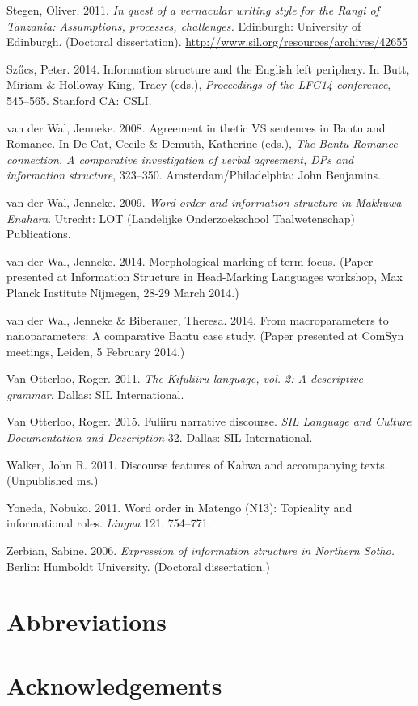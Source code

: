 \documentclass[output=paper]{langsci/langscibook}
\begin{document}
Stegen, Oliver. 2011. \textit{In quest of a vernacular writing style for the Rangi of Tanzania: Assumptions, processes, challenges.} Edinburgh: University of Edinburgh. (Doctoral dissertation). \url{http://www.sil.org/resources/archives/42655}

Szűcs, Peter. 2014. Information structure and the English left periphery. In Butt, Miriam \& Holloway King, Tracy (eds.), \textit{Proceedings of the LFG14 conference}, 545–565. Stanford CA: CSLI.

van der Wal, Jenneke. 2008. Agreement in thetic VS sentences in Bantu and Romance. In De Cat, Cecile \& Demuth, Katherine (eds.), \textit{The Bantu-Romance connection. A comparative investigation of verbal agreement, DPs and information structure}, 323–350. Amsterdam/Philadelphia: John Benjamins.

van der Wal, Jenneke. 2009. \textit{Word order and information structure in Makhuwa-Enahara}. Utrecht: LOT (Landelijke Onderzoekschool Taalwetenschap) Publications.

van der Wal, Jenneke. 2014. Morphological marking of term focus. (Paper presented at Information Structure in Head-Marking Languages workshop, Max Planck Institute Nijmegen, 28-29 March 2014.)

van der Wal, Jenneke \& Biberauer, Theresa. 2014. From macroparameters to nanoparameters: A comparative Bantu case study. (Paper presented at ComSyn meetings, Leiden, 5 February 2014.)

Van Otterloo, Roger. 2011. \textit{The Kifuliiru language, vol. 2: A descriptive grammar}. Dallas: SIL International.

Van Otterloo, Roger. 2015. Fuliiru narrative discourse. \textit{SIL Language and Culture Documentation and Descriptio}\textit{n }32. Dallas: SIL International.

Walker, John R. 2011. Discourse features of Kabwa and accompanying texts. (Unpublished ms.)

Yoneda, Nobuko. 2011. Word order in Matengo (N13): Topicality and informational roles. \textit{Lingua} 121. 754–771.

Zerbian, Sabine. 2006. \textit{Expression of information structure in Northern Sotho.} Berlin: Humboldt University. (Doctoral dissertation.)



\section*{Abbreviations}
\section*{Acknowledgements}

{\sloppy
\printbibliography[heading=subbibliography,notkeyword=this]
}
\end{document}
